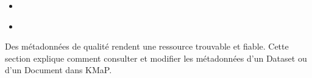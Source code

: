 \documentclass[letterpaper,10pt,english]{sphinxmanual}
\begin{document}
\begin{sphinxcontents}
\begin{itemize}
\begin{itemize}
\item {} 
\sphinxAtStartPar
{}\label{\detokenize{fr/03_gerer_metadonnees:id8}}{\hyperref[\detokenize{fr/03_gerer_metadonnees:categorie}]{}}

\item {} 
\sphinxAtStartPar
{}\label{\detokenize{fr/03_gerer_metadonnees:id9}}{\hyperref[\detokenize{fr/03_gerer_metadonnees:emprise-spatiale}]{}}

\item {} 
\sphinxAtStartPar
{}\label{\detokenize{fr/03_gerer_metadonnees:id10}}{\hyperref[\detokenize{fr/03_gerer_metadonnees:champs-de-date}]{}}

\item {} 
\sphinxAtStartPar
{}\label{\detokenize{fr/03_gerer_metadonnees:id11}}{\hyperref[\detokenize{fr/03_gerer_metadonnees:licence}]{}}

\item {} 
\sphinxAtStartPar
{}\label{\detokenize{fr/03_gerer_metadonnees:id12}}{\hyperref[\detokenize{fr/03_gerer_metadonnees:point-de-contact}]{}}

\item {} 
\sphinxAtStartPar
{}\label{\detokenize{fr/03_gerer_metadonnees:id13}}{\hyperref[\detokenize{fr/03_gerer_metadonnees:miniature}]{}}

\end{itemize}

\item {} 
\sphinxAtStartPar
{}\label{\detokenize{fr/03_gerer_metadonnees:id14}}{\hyperref[\detokenize{fr/03_gerer_metadonnees:enregistrer-les-modifications}]{}}

\item {} 
\sphinxAtStartPar
{}\label{\detokenize{fr/03_gerer_metadonnees:id15}}{\hyperref[\detokenize{fr/03_gerer_metadonnees:liste-de-controle-de-la-completude-des-metadonnees}]{}}

\end{itemize}
\end{sphinxcontents}

\sphinxAtStartPar
Des métadonnées de qualité rendent une ressource trouvable et fiable. Cette section
explique comment consulter et modifier les métadonnées d’un Dataset ou d’un Document
dans KMaP.
\end{document}
